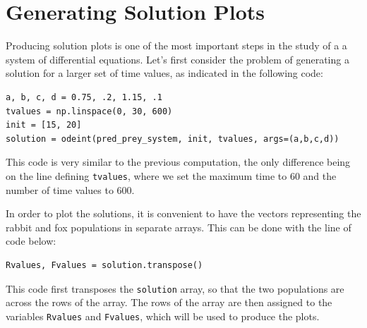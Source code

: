 \section{Generating Solution Plots}

Producing solution plots is one of the most important steps in the study of a a system of differential equations. Let's first consider the problem of generating a solution for a larger set of time values, as indicated in the following code:
\begin{lstlisting}
a, b, c, d = 0.75, .2, 1.15, .1
tvalues = np.linspace(0, 30, 600)
init = [15, 20]
solution = odeint(pred_prey_system, init, tvalues, args=(a,b,c,d))
\end{lstlisting}
This code is very similar to the previous computation, the only difference being on the line defining \texttt{tvalues}, where we set the maximum time to 60 and the number of time values to 600.

In order to plot the solutions, it is convenient to have the vectors representing the rabbit and fox populations in separate arrays. This can be done with the line of code below:
\begin{lstlisting}
Rvalues, Fvalues = solution.transpose()
\end{lstlisting}
This code first transposes the \texttt{solution} array, so that the two populations are across the rows of the array. The rows of the array are then assigned to the variables \texttt{Rvalues} and \texttt{Fvalues}, which will be used to produce the plots.

